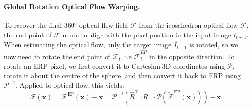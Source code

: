 \paragraph{Global Rotation Optical Flow Warping.}
To recover the final 360° optical flow field $\mathcal{F}$ from the icosahedron optical flow $\tilde{\mathcal{F}}$, the end point of $\tilde{\mathcal{F}}$ needs to align with the pixel position in the input image $I_{t+1}$.
% 
When estimating the optical flow, only the target image $I_{t+1}$ is rotated, so we now need to rotate the end point of $\tilde{\mathcal{F}}_t$, i.e $\tilde{\mathcal{F}}^{EP}_t$ in the opposite direction.
%
To rotate an ERP pixel, we first convert it to Cartesian 3D coordinates using $\mathcal{P}$, rotate it about the centre of the sphere, and then convert it back to ERP using $\mathcal{P}^{-1}$.
%
Applied to optical flow, this yields:
%
\begin{equation}\label{equ:approach:globalwarp}
	\mathcal{F}(\mathbf{x})
	= \mathcal{F}^\text{EP}(\mathbf{x}) - \mathbf{x}
	= \mathcal{P}^{-1} \left( \hat{R}^\top \cdot \bar{R}^\top \cdot \mathcal{P}(\tilde{\mathcal{F}}^\text{EP}(\mathbf{x}))\right)  - \mathbf{x}
	\text{.}
\end{equation}
\vspace{-2em}
